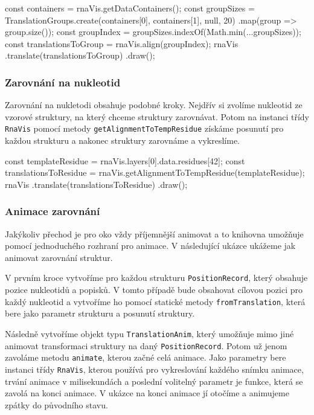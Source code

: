 \begin{code}
const containers = rnaVis.getDataContainers();
const groupSizes = 
  TranslationGroups.create(containers[0], containers[1], null, 20)
  .map(group => group.size());
const groupIndex = groupSizes.indexOf(Math.min(...groupSizes));
const translationsToGroup = rnaVis.align(groupIndex);
rnaVis
  .translate(translationsToGroup)
  .draw();
\end{code}

\subsubsection{Zarovnání na nukleotid}

Zarovnání na nukletodi obsahuje podobné kroky. Nejdřív si zvolíme nukleotid ze
vzorové struktury, na který chceme struktury zarovnávat. Potom na instanci
třídy \texttt{RnaVis} pomocí metody \texttt{getAlignmentToTempResidue} získáme
posunutí pro každou strukturu a nakonec struktury zarovnáme a vykreslíme.

\begin{code}
const templateResidue = rnaVis.layers[0].data.residues[42];
const translationsToResidue = 
  rnaVis.getAlignmentToTempResidue(templateResidue);
rnaVis
  .translate(translationsToResidue)
  .draw();
\end{code}

\subsubsection{Animace zarovnání}

Jakýkoliv přechod je pro oko vždy příjemnější animovat a to knihovna umožňuje
pomocí jednoduchého rozhraní pro animace. V následující ukázce ukážeme jak
animovat zarovnání struktur.

V prvním kroce vytvoříme pro každou strukturu \texttt{PositionRecord}, který
obsahuje pozice nukleotidů a popisků. V tomto případě bude obsahovat cílovou
pozici pro každý nukleotid a vytvoříme ho pomocí statické metody
\texttt{fromTranslation}, která bere jako parametr strukturu a posunutí
struktury.

Následně vytvoříme objekt typu \texttt{TranslationAnim}, který umožňuje mimo
jiné animovat transformaci struktury na daný \texttt{PositionRecord}. Potom už
jenom zavoláme metodu \texttt{animate}, kterou začné celá animace. Jako
parametry bere instanci třídy \texttt{RnaVis}, kterou používá pro vykreslování
každého snímku animace, trvání animace v milisekundách a poslední volitelný
parametr je funkce, která se zavolá na konci animace. V ukázce na konci animace
jí otočíme a animujeme zpátky do původního stavu.

